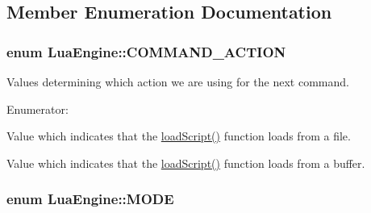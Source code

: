 \subsection{Member Enumeration Documentation}
\hypertarget{class_lua_engine_a3410f0b2ab8ca7641b79653451490d90}{
\subsubsection[{C\-O\-M\-M\-A\-N\-D\-\_\-\-A\-C\-T\-I\-O\-N}]{\setlength{\rightskip}{0pt plus 5cm}enum {\bf Lua\-Engine\-::\-C\-O\-M\-M\-A\-N\-D\-\_\-\-A\-C\-T\-I\-O\-N}}}\label{class_lua_engine_a3410f0b2ab8ca7641b79653451490d90}


Values determining which action we are using for the next command. 

\begin{Desc}
\item[Enumerator\-: ]\par
\begin{description}
\item[{\em 
\hypertarget{class_lua_engine_a3410f0b2ab8ca7641b79653451490d90aa7ee4ee2afa5c026aa8b6f709aec6242}{D\-O\-N\-T\-\_\-\-R\-E\-M\-O\-V\-E}\label{class_lua_engine_a3410f0b2ab8ca7641b79653451490d90aa7ee4ee2afa5c026aa8b6f709aec6242}
}]Value which indicates that the \hyperlink{class_lua_engine_aab9337ae5ea59bccc1e08c4015d42700}{load\-Script()} function loads from a file. \item[{\em 
\hypertarget{class_lua_engine_a3410f0b2ab8ca7641b79653451490d90a9c722598745ba82641ffd978d2ad6518}{R\-E\-M\-O\-V\-E}\label{class_lua_engine_a3410f0b2ab8ca7641b79653451490d90a9c722598745ba82641ffd978d2ad6518}
}]Value which indicates that the \hyperlink{class_lua_engine_aab9337ae5ea59bccc1e08c4015d42700}{load\-Script()} function loads from a buffer. \end{description}
\end{Desc}

\hypertarget{class_lua_engine_a70152f6f27278ec4262bd4712823a72d}{
\subsubsection[{M\-O\-D\-E}]{\setlength{\rightskip}{0pt plus 5cm}enum {\bf Lua\-Engine\-::\-M\-O\-D\-E}}}\label{class_lua_engine_a70152f6f27278ec4262bd4712823a72d}


